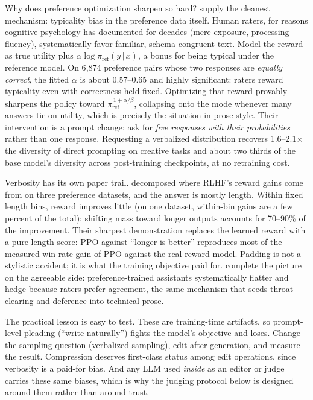 Why does preference optimization sharpen so hard? \citet{zhang2025verbalized}
supply the cleanest mechanism: typicality bias in the preference data
itself. Human raters, for reasons cognitive psychology has documented for
decades (mere exposure, processing fluency), systematically favor familiar,
schema-congruent text. Model the reward as true utility plus
$\alpha \log \pi_{\mathrm{ref}}(y\,|\,x)$, a bonus for being typical under
the reference model. On 6{,}874 preference pairs whose two responses are
\emph{equally correct}, the fitted $\alpha$ is about 0.57--0.65 and highly
significant: raters reward typicality even with correctness held fixed.
Optimizing that reward provably sharpens the policy toward
$\pi_{\mathrm{ref}}^{\,1+\alpha/\beta}$, collapsing onto the mode whenever
many answers tie on utility, which is precisely the situation in prose
style. Their intervention is a prompt change: ask for \emph{five responses
with their probabilities} rather than one response. Requesting a verbalized
distribution recovers 1.6--2.1$\times$ the diversity of direct prompting on
creative tasks and about two thirds of the base model's diversity across
post-training checkpoints, at no retraining cost.

Verbosity has its own paper trail. \citet{singhal2023length} decomposed
where RLHF's reward gains come from on three preference datasets, and the
answer is mostly length. Within fixed length bins, reward improves little
(on one dataset, within-bin gains are a few percent of the total); shifting
mass toward longer outputs accounts for 70--90\% of the improvement. Their
sharpest demonstration replaces the learned reward with a pure length score:
PPO against ``longer is better'' reproduces most of the measured win-rate
gain of PPO against the real reward model. Padding is not a stylistic
accident; it is what the training objective paid for.
\citet{sharma2024sycophancy} complete the picture on the agreeable side:
preference-trained assistants systematically flatter and hedge because
raters prefer agreement, the same mechanism that seeds throat-clearing and
deference into technical prose.

The practical lesson is easy to test. These are training-time artifacts, so
prompt-level pleading (``write naturally'') fights the model's objective and
loses. Change the sampling question (verbalized sampling), edit after
generation, and measure the result. Compression deserves
first-class status among edit operations, since verbosity is a paid-for
bias. And any LLM used \emph{inside} \hv{} as an editor or judge carries
these same biases, which is why the judging protocol below is designed
around them rather than around trust.

